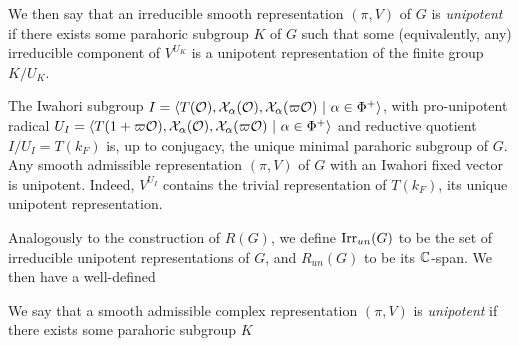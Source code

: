 We then say that an irreducible smooth representation $(\pi,V)$ of $G$ is \textit{unipotent} if there exists some parahoric subgroup $K$ of $G$ such that some (equivalently, any) irreducible component of $V^{U_K}$ is a unipotent representation of the finite group $K/U_K$.

\begin{example}
    The Iwahori subgroup $I=\langle T(\cO),\cX_\alpha(\cO),\cX_\alpha(\varpi\cO)\ |\ \alpha\in\Phi^+\rangle$, with pro-unipotent radical $U_I=\langle T(1+\varpi\cO),\cX_\alpha(\cO),\cX_\alpha(\varpi\cO)\ |\ \alpha\in\Phi^+\rangle$ and reductive quotient $I/U_I=T(k_F)$ is, up to conjugacy, the unique minimal parahoric subgroup of $G$. Any smooth admissible representation $(\pi,V)$ of $G$ with an Iwahori fixed vector is unipotent. Indeed, $V^{U_I}$ contains the trivial representation of $T(k_F)$, its unique unipotent representation. 
\end{example}

Analogously to the construction of $R(G)$, we define $\mathrm{Irr}_{un}(G)$ to be the set of irreducible unipotent representations of $G$, and $R_{un}(G)$ to be its $\mathbb{C}$-span. We then have a well-defined 



\vspace{2cm}




We say that a smooth admissible complex representation $(\pi,V)$ is \textit{unipotent} if there exists some parahoric subgroup $K$ 